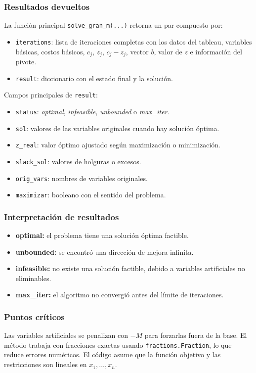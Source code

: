 \documentclass[12pt]{article}
\begin{document}
	\subsubsection{Resultados devueltos}
	La función principal \texttt{solve\_gran\_m(...)} retorna un par compuesto por:
	\begin{itemize}
		\item \texttt{iterations}: lista de iteraciones completas con los datos del tableau, variables básicas, costos básicos, $c_j$, $z_j$, $c_j - z_j$, vector $b$, valor de $z$ e información del pivote.
		\item \texttt{result}: diccionario con el estado final y la solución.
	\end{itemize}
	
	Campos principales de \texttt{result}:
	\begin{itemize}
		\item \texttt{status}: \textit{optimal}, \textit{infeasible}, \textit{unbounded} o \textit{max\_iter}.
		\item \texttt{sol}: valores de las variables originales cuando hay solución óptima.
		\item \texttt{z\_real}: valor óptimo ajustado según maximización o minimización.
		\item \texttt{slack\_sol}: valores de holguras o excesos.
		\item \texttt{orig\_vars}: nombres de variables originales.
		\item \texttt{maximizar}: booleano con el sentido del problema.
	\end{itemize}
	
	\subsubsection{Interpretación de resultados}
	\begin{itemize}
		\item \textbf{optimal:} el problema tiene una solución óptima factible.
		\item \textbf{unbounded:} se encontró una dirección de mejora infinita.
		\item \textbf{infeasible:} no existe una solución factible, debido a variables artificiales no eliminables.
		\item \textbf{max\_iter:} el algoritmo no convergió antes del límite de iteraciones.
	\end{itemize}
	
	\subsubsection{Puntos críticos}
	Las variables artificiales se penalizan con $-M$ para forzarlas fuera de la base. El método trabaja con fracciones exactas usando \texttt{fractions.Fraction}, lo que reduce errores numéricos. El código asume que la función objetivo y las restricciones son lineales en $x_1,\ldots,x_n$.
	
\end{document}
